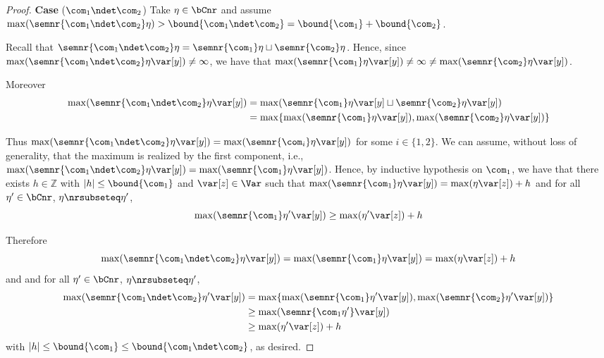 \begin{proof}
  
  \medskip
  
  \noindent
  \textbf{Case} (\(\com_1 \ndet \com_2\))
  Take \(\eta \in \bCnr\) and assume
  \(\max(\semnr{\com_1 \ndet \com_2}\eta) > \bound{\com_1 \ndet \com_2} =
  \bound{\com_1} + \bound{\com_2}\).

  Recall that
  \(\semnr{\com_1 \ndet \com_2} \eta = \semnr{\com_1}\eta \sqcup \semnr{\com_2}\eta\).
  Hence, since
  \(\max(\semnr{\com_1 \ndet \com_2} \eta \var[y]) \neq \infty\), we
  have that
  \(\max(\semnr{\com_1} \eta \var[y]) \neq \infty \neq
  \max(\semnr{\com_2}\eta \var[y])\).

  Moreover
  \begin{align*}
    \max(\semnr{\com_1 \ndet \com_2}\eta \var[y])& =  \max(\semnr{\com_1}\eta \var[y] \sqcup \semnr{\com_2}\eta \var[y]) \\ 
    & = \max \{ \max(\semnr{\com_1}\eta \var[y]), \max(\semnr{\com_2}\eta \var[y])\}
  \end{align*}

  Thus
  \(\max(\semnr{\com_1 \ndet \com_2}\eta \var[y]) =
  \max(\semnr{\com_i}\eta \var[y])\) for some \(i \in \{1,2\}\). We can
  assume, without loss of generality, that the maximum is realized
  by the first component, i.e.,
  \(\max(\semnr{\com_1 \ndet \com_2}\eta \var[y]) =
  \max(\semnr{\com_1}\eta \var[y])\). Hence, by inductive hypothesis on
  \(\com_1\), we have that there exists \(h \in \mathbb{Z}\) with
  \(|h| \leq \bound{\com_1}\) and \(\var[z] \in \Var\) such that
  \(\max(\semnr{\com_1}\eta \var[y]) = \max(\eta \var[z]) + h\) and for
  all \(\eta' \in \bCnr\), \(\eta \nrsubseteq \eta'\),
  \[
  \max(\semnr{\com_1}\eta' \var[y]) \geq \max(\eta' \var[z]) + h
  \]

  Therefore 
  \[
  \max(\semnr{\com_1 \ndet \com_2}\eta \var[y])
  = \max(\semnr{\com_1}\eta \var[y]) = \max(\eta \var[z]) + h
  \]
  and and for
  all \(\eta' \in \bCnr\), \(\eta \nrsubseteq \eta'\),
  \begin{align*}
    \max(\semnr{\com_1 \ndet \com_2}\eta' \var[y])
    &= \max\{ \max(\semnr{\com_1}\eta' \var[y]),  \max(\semnr{\com_2}\eta' \var[y])\}\\
    & \geq \max(\semnr{\com_1\eta'} \var[y])\\
    & \geq \max(\eta' \var[z]) + h
  \end{align*}
  with \(|h| \leq \bound{\com_1} \leq \bound{\com_1 \ndet \com_2}\), as desired.



\end{proof}
